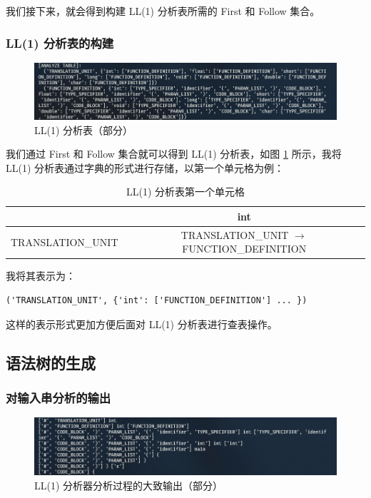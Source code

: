\documentclass[UTF8]{ctexart}
\begin{document}
我们接下来，就会得到构建 LL(1) 分析表所需的 First 和 Follow 集合。

\subsubsection{LL(1) 分析表的构建}
\begin{figure}[H]
  \includegraphics[width=\linewidth]{images/ll1_table.png}
  \caption{LL(1) 分析表（部分）}
  \label{fig:figure5}
\end{figure}

我们通过 First 和 Follow 集合就可以得到 LL(1) 分析表，如图 \ref{fig:figure5} 所示，我将 LL(1) 分析表通过字典的形式进行存储，以第一个单元格为例：

\begin{table}[H]
  \centering
  \caption{LL(1) 分析表第一个单元格}
  \label{tab:firstcell}
  \begin{tabular}{@{}c|c@{}}
  \toprule
   & int \\ \midrule
  TRANSLATION\_UNIT & TRANSLATION\_UNIT $\rightarrow$ FUNCTION\_DEFINITION \\ \bottomrule
  \end{tabular}
\end{table}

我将其表示为：

\begin{verbatim}
('TRANSLATION_UNIT', {'int': ['FUNCTION_DEFINITION'] ... })
\end{verbatim}

这样的表示形式更加方便后面对 LL(1) 分析表进行查表操作。

\subsection{语法树的生成}
\subsubsection{对输入串分析的输出}
\begin{figure}[h]
  \includegraphics[width=\linewidth]{images/parse.png}
  \caption{LL(1) 分析器分析过程的大致输出（部分）}
  \label{fig:figure6}
\end{figure}
\end{document}
